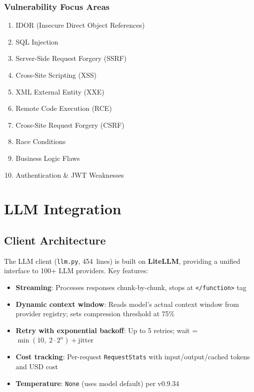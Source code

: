 \documentclass[11pt,a4paper]{article}
\begin{document}
\subsubsection{Vulnerability Focus Areas}
\begin{enumerate}[noitemsep]
  \item IDOR (Insecure Direct Object References)
  \item SQL Injection
  \item Server-Side Request Forgery (SSRF)
  \item Cross-Site Scripting (XSS)
  \item XML External Entity (XXE)
  \item Remote Code Execution (RCE)
  \item Cross-Site Request Forgery (CSRF)
  \item Race Conditions
  \item Business Logic Flaws
  \item Authentication \& JWT Weaknesses
\end{enumerate}


\section{LLM Integration}
\label{sec:llm}

\subsection{Client Architecture}
The LLM client (\texttt{llm.py}, 454~lines) is built on \textbf{LiteLLM}, providing
a unified interface to 100+ LLM providers. Key features:
\begin{itemize}[noitemsep]
  \item \textbf{Streaming}: Processes responses chunk-by-chunk, stops at
        \texttt{</function>} tag
  \item \textbf{Dynamic context window}: Reads model's actual context window from
        provider registry; sets compression threshold at 75\%
  \item \textbf{Retry with exponential backoff}: Up to 5 retries; wait =
        $\min(10,\; 2 \cdot 2^{n}) + \text{jitter}$
  \item \textbf{Cost tracking}: Per-request \texttt{RequestStats} with
        input/output/cached tokens and USD cost
  \item \textbf{Temperature}: \texttt{None} (uses model default) per v0.9.34
\end{itemize}
\end{document}
